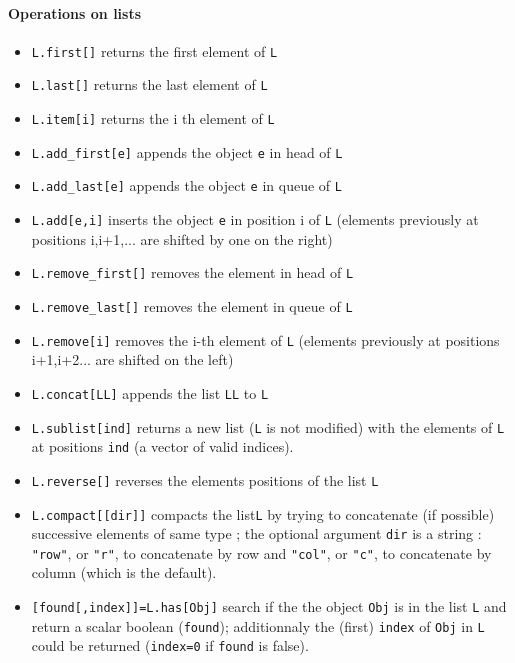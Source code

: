 \paragraph{Operations on lists}
\begin{itemize}
   \item \verb+L.first[]+ returns the first element of \verb+L+
   \item \verb+L.last[]+ returns the last element of \verb+L+
   \item \verb+L.item[i]+ returns the i th element of \verb+L+
   \item \verb+L.add_first[e]+ appends the object \verb+e+ in head of
   \verb+L+
   \item \verb+L.add_last[e]+ appends the object \verb+e+ in queue of \verb+L+
   \item \verb+L.add[e,i]+ inserts the object \verb+e+ in position i of
   \verb+L+ (elements previously at positions i,i+1,... 
             are shifted by one on the right)
   \item \verb+L.remove_first[]+ removes the element in head of \verb+L+
   \item \verb+L.remove_last[]+ removes the element in queue of \verb+L+
   \item \verb+L.remove[i]+ removes the i-th element of \verb+L+
      (elements previously at positions i+1,i+2... are shifted on the left)
   \item \verb+L.concat[LL]+ appends the list \verb+LL+ to \verb+L+
   \item \verb+L.sublist[ind]+ returns a new list (\verb+L+ is not
     modified) with the elements of \verb+L+ at positions \verb+ind+ 
   (a vector of valid indices).
   \item \verb+L.reverse[]+ reverses the elements positions of the
   list  \verb+L+
   \item \verb+L.compact[[dir]]+ compacts the list\verb+L+ by trying to concatenate
   (if possible) successive elements of same type ; the optional argument \verb+dir+
   is a string : \verb+"row"+, or \verb+"r"+, to concatenate by row
   and \verb+"col"+, or \verb+"c"+, to concatenate by
   column (which is the default). %
   \item \verb+[found[,index]]=L.has[Obj]+ search if the the object
   \verb+Obj+ is in the list \verb+L+ and return a scalar boolean (\verb+found+);
   additionnaly the (first) \verb+index+ of \verb+Obj+ in  \verb+L+ could be
   returned  (\verb+index=0+ if \verb+found+ is false).
  
\end{itemize}

